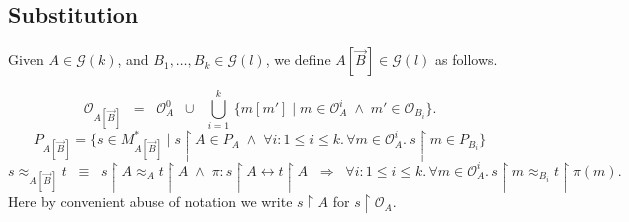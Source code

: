 \documentclass[a4paper,11pt]{article}
\newcommand{\gequiv}{\approx}
\newcommand{\GG}[1]{\mathcal{G}(#1)}
\newcommand{\restrict}{{\upharpoonright}}
\newcommand{\Occ}{\mathcal{O}}
\begin{document}
\subsection{Substitution}

Given $A \in \GG{k}$, and $B_1 , \ldots , B_k \in \GG{l}$, we define
$A[\vec{B}] \in \GG{l}$ as follows.


\[  \Occ_{A[\vec{B}]} \;\; = \;\; \Occ_A^0 \;\; \cup \;\;
\bigcup_{i=1}^k \, \{ m[m'] \mid m \in \Occ_A^i \; \wedge \; m'
\in \Occ_{B_i} \}. \]
\[
P_{A[\vec{B}]} = \{ s \in M_{A[\vec{B}]}^{\ast} \mid s \restrict A
  \in P_A
\; \wedge \;
\forall i: 1 \leq i \leq k. \, \forall m \in \Occ_A^i . \, s \restrict
m \in P_{B_i} \}
\]
\[
s \gequiv_{A[\vec{B}]} t \;\; \equiv \;\; s \restrict A \gequiv_A t
\restrict A
\; \wedge \; \pi : s \restrict A \longleftrightarrow t \restrict A \;\;
\Longrightarrow \;\;
\forall i: 1 \leq i \leq k. \, \forall m \in \Occ_A^i . \, s
\restrict m \gequiv_{B_i} t \restrict \pi (m) .
\]
Here by convenient abuse of notation we write $s \restrict A$ for $s
\restrict \Occ_A$.
\end{document}
